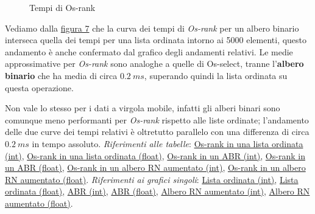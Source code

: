 \documentclass[onecolumn]{article}
\begin{document}
\begin{figure}[H]
	\caption{Tempi di Os-rank}
	\label{fig:os-rank-m}
\end{figure}

Vediamo dalla \hyperref[fig:os-rank-m]{figura 7} che la curva dei tempi di \textit{Os-rank} per un albero binario interseca quella dei tempi per una lista ordinata intorno ai 5000 elementi, questo andamento è anche confermato dal grafico degli andamenti relativi. Le medie approssimative per \textit{Os-rank} sono analoghe a quelle di Os-select, tranne l'\textbf{albero binario} che ha media di circa \(0.2\:ms\), superando quindi la lista ordinata su questa operazione.

Non vale lo stesso per i dati a virgola mobile, infatti gli alberi binari sono comunque meno performanti per \textit{Os-rank} rispetto alle liste ordinate; l'andamento delle due curve dei tempi relativi è oltretutto parallelo con una differenza di circa \(0.2\:ms\) in tempo assoluto.
\newline
\textit{Riferimenti alle tabelle}: \hyperref[label:lista-ordinata-m-os-rank]{Os-rank in una lista ordinata (int)}, \hyperref[label:lista-ordinata-m-float-os-rank]{Os-rank in una lista ordinata (float)}, \hyperref[label:abr-m-os-rank]{Os-rank in un ABR (int)}, \hyperref[label:abr-m-float-os-rank]{Os-rank in un ABR (float)}, \hyperref[label:rn-aumentato-m-os-rank]{Os-rank in un albero RN aumentato (int)}, \hyperref[label:rn-aumentato-m-float-os-rank]{Os-rank in un albero RN aumentato (float)}.
\newline
\newline
\textit{Riferimenti ai grafici singoli}: \hyperref[label:lista-ordinata-m]{Lista ordinata (int)}, \hyperref[label:lista-ordinata-m-float]{Lista ordinata (float)}, \hyperref[label:abr-m]{ABR (int)}, \hyperref[label:abr-m-float]{ABR (float)}, \hyperref[label:rn-aumentato-m]{Albero RN aumentato (int)}, \hyperref[label:rn-aumentato-m-float]{Albero RN aumentato (float)}.
\end{document}
